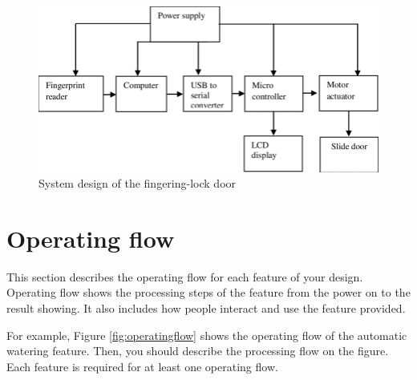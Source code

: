 \documentclass[12pt]{report}
\begin{document}
\begin{figure}[ht]
	\begin{center}
		\includegraphics[width=\textwidth]{SystemDesign.png}
		\caption{System design of the fingering-lock door}\label{fig:systemdesign}
	\end{center}
\end{figure}



\section{Operating flow}
This section describes the operating flow for each feature of your design.
Operating flow shows the processing steps of the feature from the power on to the result showing.
It also includes how people interact and use the feature provided.

For example,
Figure \ref{fig:operatingflow} shows the operating flow of the automatic watering feature.
Then, you should describe the processing flow on the figure.
Each feature is required for at least one operating flow.
\end{document}
